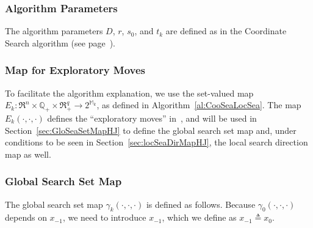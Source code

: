 \subsubsection{Algorithm Parameters}
The algorithm parameters $D$, $r$, $s_0$, and $t_k$ are defined 
as in the Coordinate Search algorithm 
(see page~\pageref{sec:AlgParCooSea}).


\subsubsection{Map for Exploratory Moves}
To facilitate the algorithm explanation, we use
the set-valued map 
$E_k \colon \Re^n \times \mathbb Q_+ \times \Re_+^q \to 2^{\mathbb M_k}$, 
as defined in Algorithm~\ref{al:CooSeaLocSea}.
The map $E_k(\cdot,\cdot,\cdot)$ defines the
``exploratory moves'' in~\cite{HookeJee1961}, and
will be used in Section~\ref{sec:GloSeaSetMapHJ}
to define the global search set map and,
under conditions to be seen in Section~\ref{sec:locSeaDirMapHJ},
the local search direction map as well.\\
\subsubsection{Global Search Set Map}

The global search set map
$\gamma_k(\cdot, \cdot, \cdot)$ is defined as follows. Because
$\gamma_0(\cdot, \cdot, \cdot)$ depends on $x_{-1}$, we need to introduce
$x_{-1}$, which we define as $x_{-1} \triangleq x_0$.\\


